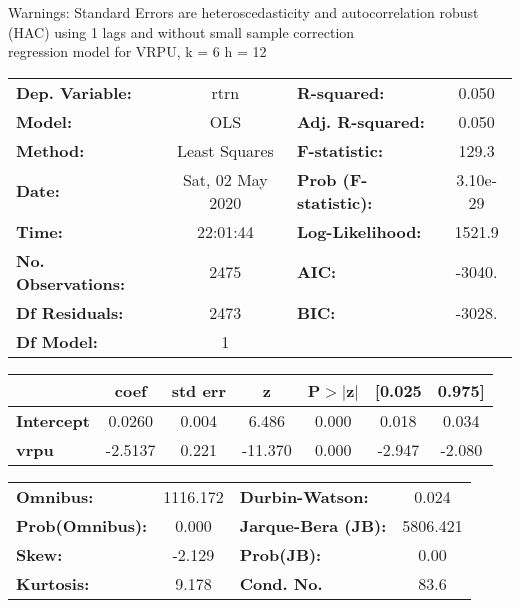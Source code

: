 Warnings: \newline
 [1] Standard Errors are heteroscedasticity and autocorrelation robust (HAC) using 1 lags and without small sample correction\\ 

regression model for VRPU, k = 6 h = 12\begin{center}
\begin{tabular}{lclc}
\toprule
\textbf{Dep. Variable:}    &       rtrn       & \textbf{  R-squared:         } &     0.050   \\
\textbf{Model:}            &       OLS        & \textbf{  Adj. R-squared:    } &     0.050   \\
\textbf{Method:}           &  Least Squares   & \textbf{  F-statistic:       } &     129.3   \\
\textbf{Date:}             & Sat, 02 May 2020 & \textbf{  Prob (F-statistic):} &  3.10e-29   \\
\textbf{Time:}             &     22:01:44     & \textbf{  Log-Likelihood:    } &    1521.9   \\
\textbf{No. Observations:} &        2475      & \textbf{  AIC:               } &    -3040.   \\
\textbf{Df Residuals:}     &        2473      & \textbf{  BIC:               } &    -3028.   \\
\textbf{Df Model:}         &           1      & \textbf{                     } &             \\
\bottomrule
\end{tabular}
\begin{tabular}{lcccccc}
                   & \textbf{coef} & \textbf{std err} & \textbf{z} & \textbf{P$> |$z$|$} & \textbf{[0.025} & \textbf{0.975]}  \\
\midrule
\textbf{Intercept} &       0.0260  &        0.004     &     6.486  &         0.000        &        0.018    &        0.034     \\
\textbf{vrpu}      &      -2.5137  &        0.221     &   -11.370  &         0.000        &       -2.947    &       -2.080     \\
\bottomrule
\end{tabular}
\begin{tabular}{lclc}
\textbf{Omnibus:}       & 1116.172 & \textbf{  Durbin-Watson:     } &    0.024  \\
\textbf{Prob(Omnibus):} &   0.000  & \textbf{  Jarque-Bera (JB):  } & 5806.421  \\
\textbf{Skew:}          &  -2.129  & \textbf{  Prob(JB):          } &     0.00  \\
\textbf{Kurtosis:}      &   9.178  & \textbf{  Cond. No.          } &     83.6  \\
\bottomrule
\end{tabular}
\end{center}

